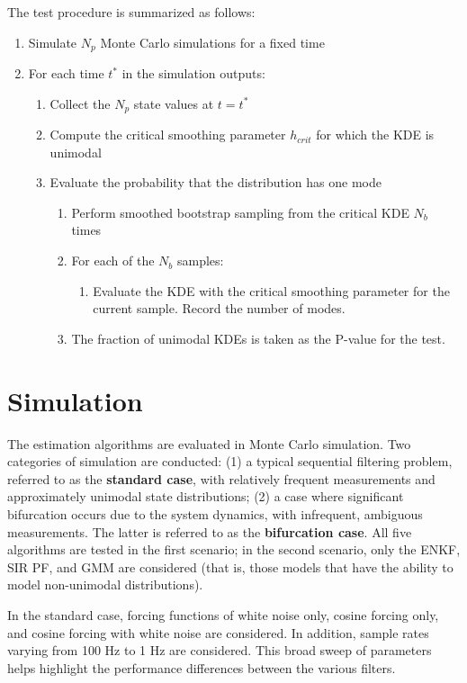 \documentclass[]{article}
\begin{document}
The test procedure is summarized as follows:

\begin{enumerate}
\item Simulate $N_p$ Monte Carlo simulations for a fixed time
\item For each time $t^*$ in the simulation outputs:
\begin{enumerate}
	\item Collect the $N_p$ state values at $t = t^*$
	\item Compute the critical smoothing parameter $h_{crit}$ for which the KDE is unimodal
	\item Evaluate the probability that the distribution has one mode
	\begin{enumerate}
		\item Perform smoothed bootstrap sampling from the critical KDE $N_b$ times
		\item For each of the $N_b$ samples:
		\begin{enumerate}
			\item Evaluate the KDE with the critical smoothing parameter for the current sample. Record the number of modes.
		\end{enumerate}
		\item The fraction of unimodal KDEs is taken as the P-value for the test.	
	\end{enumerate}
\end{enumerate}
\end{enumerate}

\section{Simulation}

The estimation algorithms are evaluated in Monte Carlo simulation. Two categories of simulation are conducted: (1) a typical sequential filtering problem, referred to as the \textbf{standard case}, with relatively frequent measurements and approximately unimodal state distributions; (2) a case where significant bifurcation occurs due to the system dynamics, with infrequent, ambiguous measurements. The latter is referred to as the \textbf{bifurcation case}. All five algorithms are tested in the first scenario; in the second scenario, only the ENKF, SIR PF, and GMM are considered (that is, those models that have the ability to model non-unimodal distributions).

In the standard case, forcing functions of white noise only, cosine forcing only, and cosine forcing with white noise are considered. In addition, sample rates varying from 100 Hz to 1 Hz are considered. This broad sweep of parameters helps highlight the performance differences between the various filters.
\end{document}
